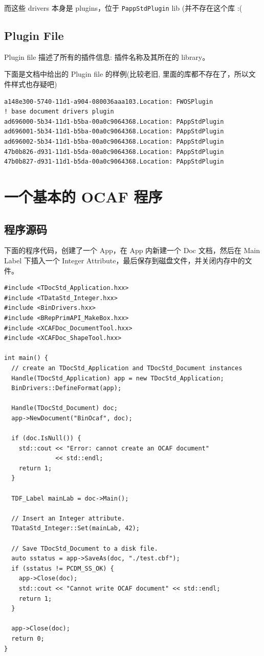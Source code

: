 \documentclass[11pt]{article}
\let\oldsection\section
\renewcommand{\section}{\clearpage\oldsection}
\begin{document}
而这些 drivers 本身是 plugins，位于 \texttt{PappStdPlugin} lib (并不存在这个库 :(
\subsection{Plugin File}
\label{sec:org0757a8b}

Plugin file 描述了所有的插件信息: 插件名称及其所在的 library。

下面是文档中给出的 Plugin file 的样例(比较老旧, 里面的库都不存在了，所以文件样式也存疑吧)

\begin{verbatim}
a148e300-5740-11d1-a904-080036aaa103.Location: FWOSPlugin
! base document drivers plugin
ad696000-5b34-11d1-b5ba-00a0c9064368.Location: PAppStdPlugin
ad696001-5b34-11d1-b5ba-00a0c9064368.Location: PAppStdPlugin
ad696002-5b34-11d1-b5ba-00a0c9064368.Location: PAppStdPlugin
47b0b826-d931-11d1-b5da-00a0c9064368.Location: PAppStdPlugin
47b0b827-d931-11d1-b5da-00a0c9064368.Location: PAppStdPlugin
\end{verbatim}
\section{一个基本的 OCAF 程序}
\label{sec:org685b3b9}

\subsection{程序源码}
\label{sec:org890d179}

下面的程序代码，创建了一个 App，在 App 内新建一个 Doc 文档，然后在 Main Label 下插入一个 Integer Attribute，最后保存到磁盘文件，并关闭内存中的文件。

\begin{verbatim}
#include <TDocStd_Application.hxx>
#include <TDataStd_Integer.hxx>
#include <BinDrivers.hxx>
#include <BRepPrimAPI_MakeBox.hxx>
#include <XCAFDoc_DocumentTool.hxx>
#include <XCAFDoc_ShapeTool.hxx>

int main() {
  // create an TDocStd_Application and TDocStd_Document instances
  Handle(TDocStd_Application) app = new TDocStd_Application;
  BinDrivers::DefineFormat(app);

  Handle(TDocStd_Document) doc;
  app->NewDocument("BinOcaf", doc);

  if (doc.IsNull()) {
    std::cout << "Error: cannot create an OCAF document"
              << std::endl;
    return 1;
  }

  TDF_Label mainLab = doc->Main();

  // Insert an Integer attribute.
  TDataStd_Integer::Set(mainLab, 42);

  // Save TDocStd_Document to a disk file.
  auto sstatus = app->SaveAs(doc, "./test.cbf");
  if (sstatus != PCDM_SS_OK) {
    app->Close(doc);
    std::cout << "Cannot write OCAF document" << std::endl;
    return 1;
  }

  app->Close(doc);
  return 0;
}
\end{verbatim}
\end{document}
